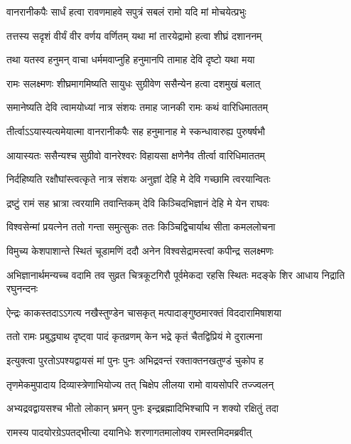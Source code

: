 \twolineshloka
{वानरानीकपैः सार्धं हत्वा रावणमाहवे}
{सपुत्रं सबलं रामो यदि मां मोचयेत्प्रभुः} %

\twolineshloka
{तत्तस्य सदृशं वीर्यं वीर वर्णय वर्णितम्}
{यथा मां तारयेद्रामो हत्वा शीघ्रं दशाननम्} %

\twolineshloka
{तथा यतस्व हनुमन् वाचा धर्ममवाप्नुहि}
{हनुमानपि तामाह देवि दृष्टो यथा मया} %

\twolineshloka
{रामः सलक्ष्मणः शीघ्रमागमिष्यति सायुधः}
{सुग्रीवेण ससैन्येन हत्वा दशमुखं बलात्} %

\twolineshloka
{समानेष्यति देवि त्वामयोध्यां नात्र संशयः}
{तमाह जानकी रामः कथं वारिधिमाततम्} %

\twolineshloka
{तीर्त्वाऽऽयास्यत्यमेयात्मा वानरानीकपैः सह}
{हनुमानाह मे स्कन्धावारुह्य पुरुषर्षभौ} %

\twolineshloka
{आयास्यतः ससैन्यश्च सुग्रीवो वानरेश्वरः}
{विहायसा क्षणेनैव तीर्त्वा वारिधिमाततम्} %

\twolineshloka
{निर्दहिष्यति रक्षौघांस्त्वत्कृते नात्र संशयः}
{अनुज्ञां देहि मे देवि गच्छामि त्वरयान्वितः} %

\twolineshloka
{द्रष्टुं रामं सह भ्रात्रा त्वरयामि तवान्तिकम्}
{देवि किञ्चिदभिज्ञानं देहि मे येन राघवः} %

\twolineshloka
{विश्वसेन्मां प्रयत्नेन ततो गन्ता समुत्सुकः}
{ततः किञ्चिद्विचार्याथ सीता कमललोचना} %

\twolineshloka
{विमुच्य केशपाशान्ते स्थितं चूडामणिं ददौ}
{अनेन विश्वसेद्रामस्त्वां कपीन्द्र सलक्ष्मणः} %

\threelineshloka
{अभिज्ञानार्थमन्यच्च वदामि तव सुव्रत}
{चित्रकूटगिरौ पूर्वमेकदा रहसि स्थितः}
{मदङ्के शिर आधाय निद्राति रघुनन्दनः} %

\twolineshloka
{ऐन्द्रः काकस्तदाऽऽगत्य नखैस्तुण्डेन चासकृत्}
{मत्पादाङ्गुष्ठमारक्तं विददारामिषाशया} %

\twolineshloka
{ततो रामः प्रबुद्ध्याथ दृष्ट्वा पादं कृतव्रणम्}
{केन भद्रे कृतं चैतद्विप्रियं मे दुरात्मना} %

\twolineshloka
{इत्युक्त्वा पुरतोऽपश्यद्वायसं मां पुनः पुनः}
{अभिद्रवन्तं रक्ताक्तनखतुण्डं चुकोप ह} %

\twolineshloka
{तृणमेकमुपादाय दिव्यास्त्रेणाभियोज्य तत्}
{चिक्षेप लीलया रामो वायसोपरि तज्ज्वलन्} %

\twolineshloka
{अभ्यद्रवद्वायसश्च भीतो लोकान् भ्रमन् पुनः}
{इन्द्रब्रह्मादिभिश्चापि न शक्यो रक्षितुं तदा} %

\twolineshloka
{रामस्य पादयोरग्रेऽपतद्भीत्या दयानिधेः}
{शरणागतमालोक्य रामस्तमिदमब्रवीत्} %

